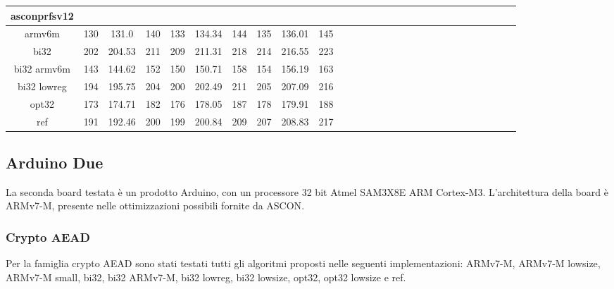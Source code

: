\documentclass[12pt,a4paper,italian]{report}
\begin{document}
\begin{landscape}
\begin{table}[]
\begin{adjustbox}{width=600pt}
\begin{tabular}{|c|c|c|c|c|c|c|c|c|c|c|c|c|c|c|c|c|c|c|c|c|c|c|c|c|c|c|c|}
				\hline
                asconprfsv12 & & & & & & & & & & & & & & & & & & & & & & & & & & & \\
				\hline
				armv6m & 130 & 131.0 & 140 & 133 & 134.34 & 144 & 135 & 136.01 & 145 & & & & & & & & & & & & & & & & & &\\
				\hline
				bi32 & 202 & 204.53 & 211 & 209 & 211.31 & 218 & 214 & 216.55 & 223 & & & & & & & & & & & & & & & & & & \\
				\hline
				bi32 armv6m & 143 & 144.62 & 152 & 150 & 150.71 & 158 & 154 & 156.19 & 163 & & & & & & & & & & & & & & & & & & \\
				\hline
				bi32 lowreg & 194 & 195.75 & 204 & 200 & 202.49 & 211 & 205 & 207.09 & 216 & & & & & & & & & & & & & & & & & & \\
				\hline
				opt32 & 173 & 174.71 & 182 & 176 & 178.05 & 187 & 178 & 179.91 & 188 & & & & & & & & & & & & & & & & & & \\
				\hline
				ref & 191 & 192.46 & 200 & 199 & 200.84 & 209 & 207 & 208.83 & 217 & & & & & & & & & & & & & & & & & & \\
				\hline
			\end{tabular}
		\end{adjustbox}
	\end{table}
\end{landscape}

\subsection{Arduino Due}

La seconda board testata è un prodotto Arduino, con un processore 32 bit Atmel SAM3X8E ARM Cortex-M3\cite{arduino}. L'architettura della board è ARMv7-M, presente nelle ottimizzazioni possibili fornite da ASCON\cite{arm}.

\subsubsection{Crypto AEAD}

Per la famiglia crypto AEAD sono stati testati tutti gli algoritmi proposti nelle seguenti implementazioni: ARMv7-M, ARMv7-M lowsize, ARMv7-M small, bi32, bi32 ARMv7-M, bi32 lowreg, bi32 lowsize, opt32, opt32 lowsize e ref.
\end{document}
